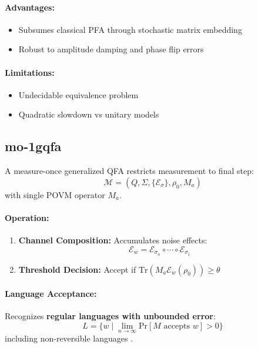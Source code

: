 \paragraph{Advantages:}
\begin{itemize}
    \item Subsumes classical PFA through stochastic matrix embedding
    \item Robust to amplitude damping and phase flip errors
\end{itemize}

\paragraph{Limitations:}
\begin{itemize}
    \item Undecidable equivalence problem \cite{blondel2003equivalence}
    \item Quadratic slowdown vs unitary models
\end{itemize}

\subsection{\acrfull{mo-1gqfa}}
\label{subsec:mo-1gqfa}

\begin{definition}
A measure-once generalized QFA restricts measurement to final step:
\[
\mathcal{M} = (Q, \Sigma, \{\mathcal{E}_\sigma\}, \rho_0, M_a)
\]
with single POVM operator $M_a$.
\end{definition}

\paragraph{Operation:}
\begin{enumerate}
    \item \textbf{Channel Composition:} Accumulates noise effects:
    \[
    \mathcal{E}_w = \mathcal{E}_{\sigma_n} \circ \cdots \circ \mathcal{E}_{\sigma_1}
    \]
    \item \textbf{Threshold Decision:} Accept if $\text{Tr}(M_a\mathcal{E}_w(\rho_0)) \geq \theta$
\end{enumerate}

\paragraph{Language Acceptance:}
Recognizes \textbf{regular languages with unbounded error}:
\[
L = \{w \mid \lim_{n\to\infty} \text{Pr}[M \text{ accepts } w] > 0\}
\]
including non-reversible languages \cite{hirvensalo2012quantum}.


